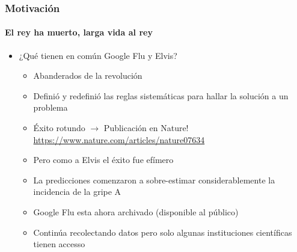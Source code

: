\documentclass[
  shownotes,
  xcolor={svgnames},
  hyperref={colorlinks,citecolor=DarkBlue,linkcolor=DarkRed,urlcolor=DarkBlue}
  , aspectratio=169]{beamer}
\begin{document}
\begin{frame}
\frametitle{Motivación}
\framesubtitle{El rey ha muerto, larga vida al rey}
  \begin{itemize}
    \item ¿Qué tienen en común Google Flu y Elvis?
    \bigskip
    \begin{itemize}
      \item Abanderados de la revolución
      \medskip
      \item Definió y redefinió las reglas sistemáticas para hallar la solución a un problema
      \medskip
      \item Éxito rotundo $\rightarrow$ Publicación en Nature! \url{https://www.nature.com/articles/nature07634}
      \medskip
      \item Pero como a Elvis el éxito fue efímero
      \medskip
      \item La predicciones comenzaron a sobre-estimar considerablemente la incidencia de la gripe A
      \medskip
      \item Google Flu esta ahora archivado (disponible al público)
      \medskip
      \item Continúa recolectando datos pero solo algunas instituciones científicas tienen accesso 
    \end{itemize}  
  \end{itemize}  
\end{frame}
\end{document}
